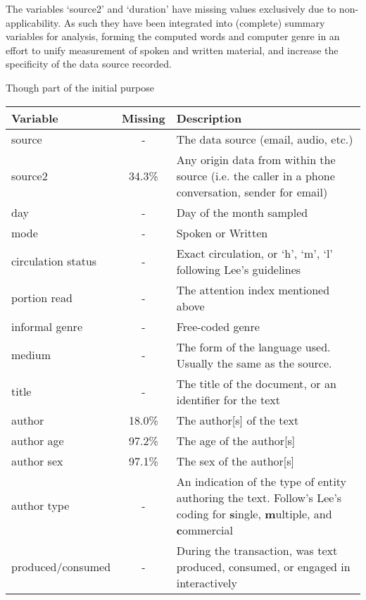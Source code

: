 The variables `source2' and `duration' have missing values exclusively due to non-applicability.  As such they have been integrated into (complete) summary variables for analysis, forming the computed words and computer genre in an effort to unify measurement of spoken and written material, and increase the specificity of the data source recorded.

Though part of the initial purpose 


\begin{table}[hp]
\centering
    \begin{tabular}{ | l | c | p{7cm} |}
    \hline
    \textbf{Variable} & \textbf{Missing} & \textbf{Description} \\ \hline
   
    source              & - & The data source (email, audio, etc.) \\ \hline
    source2             & 34.3\% & Any origin data from within the source (i.e. the caller in a phone conversation, sender for email) \\ \hline
    day                 & - & Day of the month sampled \\ \hline
    mode                & - & Spoken or Written \\ \hline
    circulation status  & - & Exact circulation, or `h', `m', `l' following Lee's guidelines\\ \hline
    portion read        & - & The attention index mentioned above \\ \hline
    informal genre      & - & Free-coded genre \\ \hline
    medium              & - & The form of the language used.  Usually the same as the source. \\ \hline
    title               & - & The title of the document, or an identifier for the text \\ \hline
    author              & 18.0\% & The author[s] of the text\\ \hline
    author age          & 97.2\% & The age of the author[s] \\ \hline
    author sex          & 97.1\% & The sex of the author[s] \\ \hline
    author type         & - & An indication of the type of entity authoring the text.  Follow's Lee's coding for \textbf{s}ingle, \textbf{m}ultiple, and \textbf{c}ommercial\\ \hline
    produced/consumed   & - & During the transaction, was text produced, consumed, or engaged in interactively \\ \hline 

\end{tabular}
\end{table}
